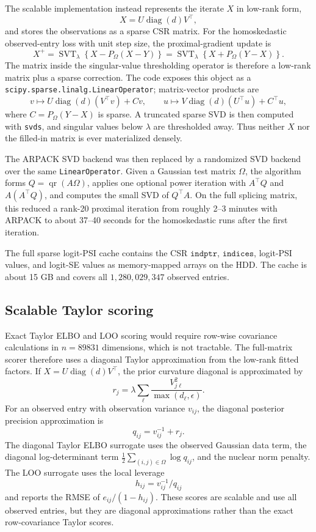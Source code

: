 \documentclass[11pt]{article}
\begin{document}
The scalable implementation instead represents the iterate \(X\) in low-rank
form,
\[
X = U\operatorname{diag}(d)V^\top,
\]
and stores the observations as a sparse CSR matrix.  For the homoskedastic
observed-entry loss with unit step size, the proximal-gradient update is
\[
X^{+}
=
\operatorname{SVT}_{\lambda}
\left\{
X - P_{\Omega}(X-Y)
\right\}
=
\operatorname{SVT}_{\lambda}
\left\{
X + P_{\Omega}(Y-X)
\right\}.
\]
The matrix inside the singular-value thresholding operator is therefore a
low-rank matrix plus a sparse correction.  The code exposes this object as a
\texttt{scipy.sparse.linalg.LinearOperator}; matrix-vector products are
\[
v \mapsto U\operatorname{diag}(d)(V^\top v) + C v,
\qquad
u \mapsto V\operatorname{diag}(d)(U^\top u) + C^\top u,
\]
where \(C=P_{\Omega}(Y-X)\) is sparse.  A truncated sparse SVD is then computed
with \texttt{svds}, and singular values below \(\lambda\) are thresholded away.
Thus neither \(X\) nor the filled-in matrix is ever materialized densely.

The ARPACK SVD backend was then replaced by a randomized SVD backend over the
same \texttt{LinearOperator}.  Given a Gaussian test matrix \(\Omega\), the
algorithm forms \(Q=\operatorname{qr}(A\Omega)\), applies one optional power
iteration with \(A^\top Q\) and \(A(A^\top Q)\), and computes the small SVD of
\(Q^\top A\).  On the full splicing matrix, this reduced a rank-20 proximal
iteration from roughly 2--3 minutes with ARPACK to about 37--40 seconds for the
homoskedastic runs after the first iteration.

The full sparse logit-PSI cache contains the CSR \(\texttt{indptr}\),
\(\texttt{indices}\), logit-PSI values, and logit-SE values as memory-mapped
arrays on the HDD.  The cache is about 15 GB and covers all
\(1{,}280{,}029{,}347\) observed entries.

\subsection{Scalable Taylor scoring}

Exact Taylor ELBO and LOO scoring would require row-wise covariance calculations
in \(n=89831\) dimensions, which is not tractable.  The full-matrix scorer
therefore uses a diagonal Taylor approximation from the low-rank fitted factors.
If \(X=U\operatorname{diag}(d)V^\top\), the prior curvature diagonal is
approximated by
\[
r_j
=
\lambda
\sum_{\ell}
\frac{V_{j\ell}^2}{\max(d_\ell,\epsilon)}.
\]
For an observed entry with observation variance \(v_{ij}\), the diagonal
posterior precision approximation is
\[
q_{ij}=v_{ij}^{-1}+r_j.
\]
The diagonal Taylor ELBO surrogate uses the observed Gaussian data term, the
diagonal log-determinant term \(\frac12\sum_{(i,j)\in\Omega}\log q_{ij}\), and
the nuclear norm penalty.  The LOO surrogate uses the local leverage
\[
h_{ij}=v_{ij}^{-1}/q_{ij}
\]
and reports the RMSE of \(e_{ij}/(1-h_{ij})\).  These scores are scalable and
use all observed entries, but they are diagonal approximations rather than the
exact row-covariance Taylor scores.
\end{document}
